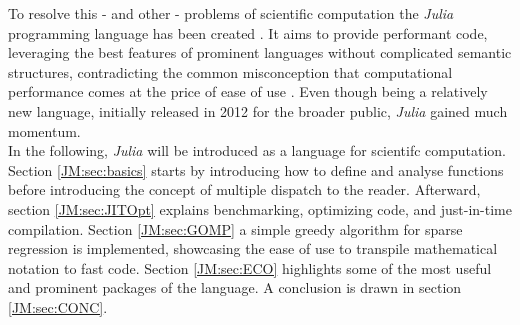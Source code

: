 To resolve this - and other - problems of scientific computation the \textit{Julia} programming language has been created \cite{JMBezansonEtAl2015}. It aims to provide performant code, leveraging the best features of 
prominent languages without complicated semantic structures, contradicting the common misconception that computational performance comes at the price of ease of use \cite{JMEdelman2019}. 
Even though being a relatively new language, initially released in 2012 for the broader public, \textit{Julia} gained much momentum. \\

In the following, \textit{Julia} will be introduced as a language for scientifc computation. Section \ref{JM:sec:basics} starts by introducing how to define and analyse functions before introducing the concept of multiple dispatch to the reader.
Afterward, section \ref{JM:sec:JITOpt} explains benchmarking, optimizing code, and just-in-time compilation. Section \ref{JM:sec:GOMP} a simple greedy algorithm for sparse regression is implemented, showcasing the ease of use to transpile mathematical notation to fast code.
Section \ref{JM:sec:ECO} highlights some of the most useful and prominent packages of the language.
A conclusion is drawn in section \ref{JM:sec:CONC}.

\newpage
